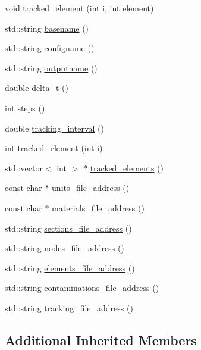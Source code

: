 \begin{DoxyCompactItemize}
\item 
void \hyperlink{classtds__run_a992893887cdbc12a5169ddb4433ed2fc}{tracked\+\_\+element} (int i, int \hyperlink{classtds_aec8ca7ac2f04016feeac7bb3f06da314}{element})
\item 
std\+::string \hyperlink{classtds__run_a137f612e6b407e454bccad95afbb21a9}{basename} ()
\item 
std\+::string \hyperlink{classtds__run_a9e8f81d142ee0b76bfd6e9e28d2b63f3}{configname} ()
\item 
std\+::string \hyperlink{classtds__run_a1d9a5d498afe05b982a0a7f748eb8210}{outputname} ()
\item 
double \hyperlink{classtds__run_a5e48a031180b7523e53378f5174d79a3}{delta\+\_\+t} ()
\item 
int \hyperlink{classtds__run_a62c2082354b12fb78a2888ab719c1ad9}{steps} ()
\item 
double \hyperlink{classtds__run_a55ac0838be1171fc81aa8c029c582074}{tracking\+\_\+interval} ()
\item 
int \hyperlink{classtds__run_a163561d49e453bae8832cea7330f2e6f}{tracked\+\_\+element} (int i)
\item 
std\+::vector$<$ int $>$ $\ast$ \hyperlink{classtds__run_aba189393afcc21e3320bef781ddbe67d}{tracked\+\_\+elements} ()
\item 
const char $\ast$ \hyperlink{classtds__run_a4d3f91ec85fde67fca2be01c65c9e055}{units\+\_\+file\+\_\+address} ()
\item 
const char $\ast$ \hyperlink{classtds__run_af89342b9231d4b99a83ff55d1ca5b969}{materials\+\_\+file\+\_\+address} ()
\item 
std\+::string \hyperlink{classtds__run_af40ce5e25f42be9e10b5477c0608f165}{sections\+\_\+file\+\_\+address} ()
\item 
std\+::string \hyperlink{classtds__run_abbf40891531e0cf9fd4c7900332fe36e}{nodes\+\_\+file\+\_\+address} ()
\item 
std\+::string \hyperlink{classtds__run_a89253a539c775d4b68c539b428127d36}{elements\+\_\+file\+\_\+address} ()
\item 
std\+::string \hyperlink{classtds__run_a8ff6cd6b421f73c0d77add4dd27e204e}{contaminations\+\_\+file\+\_\+address} ()
\item 
std\+::string \hyperlink{classtds__run_a5e46adee5b685171212fb294c282c27d}{tracking\+\_\+file\+\_\+address} ()
\end{DoxyCompactItemize}
\subsection*{Additional Inherited Members}


